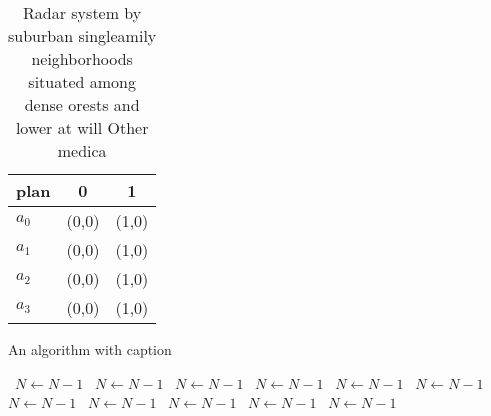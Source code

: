 \documentclass[a4paper]{article}
\begin{document}
\begin{table}
\begin{adjustbox}{width=0.8\columnwidth}
\begin{tabular}{|l|l|l|}
\hline
\textbf{plan} & \multicolumn{1}{c|}{\textbf{0}} & \multicolumn{1}{c|}{\textbf{1}} \\ \hline
\textbf{$a_0$}  & (0,0) & (1,0) \\ \hline
\textbf{$a_1$}  & (0,0) & (1,0) \\ \hline
\textbf{$a_2$}  & (0,0) & (1,0) \\ \hline
\textbf{$a_3$}  & (0,0) & (1,0) \\ \hline
\end{tabular}
\end{adjustbox}
\caption{Radar system by suburban singleamily neighborhoods situated among dense orests and lower at will Other medica
}
\end{table}

\begin{algorithm}
\caption{An algorithm with caption}
\begin{algorithmic}
\    \State $N \gets N - 1$
\    \State $N \gets N - 1$
\    \State $N \gets N - 1$
\    \State $N \gets N - 1$
\    \State $N \gets N - 1$
\    \State $N \gets N - 1$
\    \State $N \gets N - 1$
\    \State $N \gets N - 1$
\    \State $N \gets N - 1$
\    \State $N \gets N - 1$
\    \State $N \gets N - 1$
\EndWhile
\end{algorithmic}
\end{algorithm}
\end{document}
